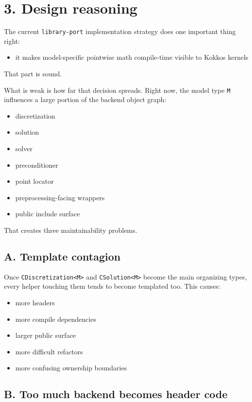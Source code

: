 \documentclass[11pt]{article}
\begin{document}
\section*{3. Design reasoning}

The current \texttt{library-port} implementation strategy does one important thing right:

\begin{itemize}[leftmargin=*]
\item it makes model-specific pointwise math compile-time visible to Kokkos kernels
\end{itemize}

That part is sound.

What is weak is how far that decision spreads. Right now, the model type \texttt{M} influences a large portion of the backend object graph:

\begin{itemize}[leftmargin=*]
\item discretization
\item solution
\item solver
\item preconditioner
\item point locator
\item preprocessing-facing wrappers
\item public include surface
\end{itemize}

That creates three maintainability problems.

\subsection*{A. Template contagion}

Once \texttt{CDiscretization<M>} and \texttt{CSolution<M>} become the main organizing types, every helper touching them tends to become templated too. This causes:

\begin{itemize}[leftmargin=*]
\item more headers
\item more compile dependencies
\item larger public surface
\item more difficult refactors
\item more confusing ownership boundaries
\end{itemize}

\subsection*{B. Too much backend becomes header code}
\end{document}
